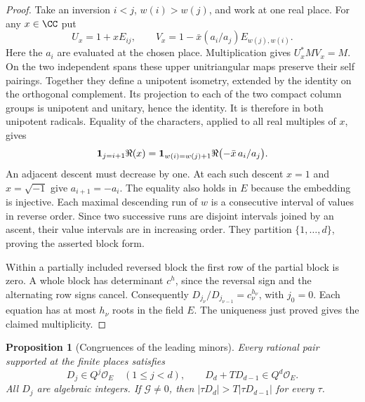 \documentclass[a4paper,11pt]{article}
\newtheorem{proposition}{Proposition}[section]
\theoremstyle{definition}
\theoremstyle{remark}
\numberwithin{equation}{section}
\begin{document}
\begin{proof}
Take an inversion \(i<j\), \(w(i)>w(j)\), and work at one real
place. For any \(x\in\CC\) put
\[
 U_x=1+xE_{ij},\qquad
 V_x=1-\bar x(a_i/a_j)E_{w(j),w(i)} .
\]
Here the \(a_i\) are evaluated at the chosen place.
Multiplication gives \(U_x^* M V_x=M\). On the two independent
spans these upper unitriangular maps preserve their self pairings.
Together they define a unipotent isometry, extended by the identity
on the orthogonal complement. Its projection to each of the two
compact column groups is unipotent and unitary, hence the identity.
It is therefore in both unipotent radicals. Equality of the
characters, applied to all real multiples of \(x\), gives
\[
 {\bf1}_{j=i+1}\Re(x)
  ={\bf1}_{w(i)=w(j)+1}\Re\bigl(-\bar x\,a_i/a_j\bigr).
\]
An adjacent descent must decrease by one. At each such descent
\(x=1\) and \(x=\sqrt{-1}\) give \(a_{i+1}=-a_i\). The equality
also holds in \(E\) because the embedding is injective. Each maximal
descending run of \(w\) is a consecutive interval of values in
reverse order. Since two successive runs are disjoint intervals
joined by an ascent, their value intervals are in increasing order.
They partition \(\{1,\ldots,d\}\), proving the asserted block form.

Within a partially included reversed block the first row of the
partial block is zero. A whole block has determinant \(c^h\),
since the reversal sign and the alternating row signs cancel.
Consequently \(D_{j_\nu}/D_{j_{\nu-1}}=c_\nu^{h_\nu}\), with
\(j_0=0\). Each equation has at most \(h_\nu\) roots in the field
\(E\). The uniqueness just proved gives the claimed multiplicity.
\end{proof}

\begin{proposition}[Congruences of the leading minors]\label{prop:shift203}
Every rational pair supported at the finite places satisfies
\[
  D_j\in Q^j\mathcal O_E\quad(1\le j<d),\qquad
  D_d+T D_{d-1}\in Q^d\mathcal O_E .
\]
All \(D_j\) are algebraic integers. If \(\mathcal G\ne0\), then
\(\lvert\tau D_d\rvert>T\lvert\tau D_{d-1}\rvert\) for every
\(\tau\).
\end{proposition}
\end{document}

